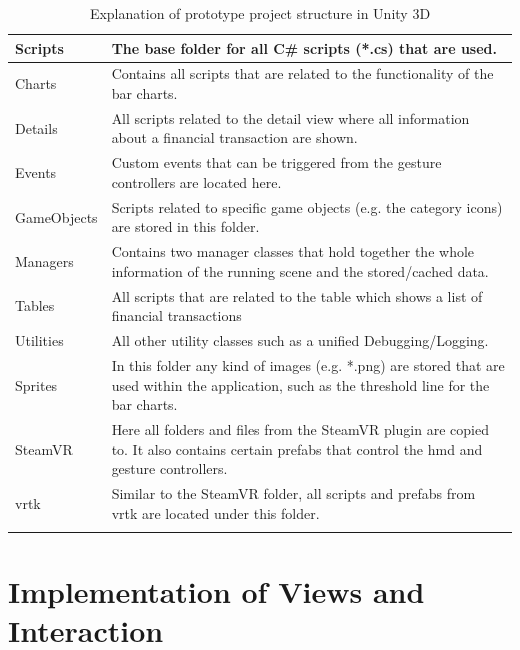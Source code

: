 \begin{longtable}{ | p{3cm} | p{11cm} |}
	\hline
		Scripts &
		The base folder for all C\# scripts (*.cs) that are used. \\
	\hline
		\textrightarrow{} Charts &
		Contains all scripts that are related to the functionality of the bar charts. \\
	\hline
		\textrightarrow{} Details &
		All scripts related to the detail view where all information about a financial transaction are shown. \\
	\hline
		\textrightarrow{} Events &
		Custom events that can be triggered from the gesture controllers are located here. \\
	\hline
		\textrightarrow{} GameObjects &
		Scripts related to specific game objects (e.g. the category icons) are stored in this folder. \\
	\hline
		\textrightarrow{} Managers &
		Contains two manager classes that hold together the whole information of the running scene and the stored/cached data. \\
	\hline
		\textrightarrow{} Tables &
		All scripts that are related to the table which shows a list of financial transactions \\
	\hline
		\textrightarrow{} Utilities &
		All other utility classes such as a unified Debugging/Logging. \\
	\hline
		Sprites &
		In this folder any kind of images (e.g. *.png) are stored that are used within the application, such as the threshold line for the bar charts. \\
	\hline
		SteamVR &
		Here all folders and files from the SteamVR plugin are copied to. It also contains certain prefabs that control the \gls{hmd} and gesture controllers. \\
	\hline
		\gls{vrtk} &
		Similar to the SteamVR folder, all scripts and prefabs from \gls{vrtk} are located under this folder. \\
	\hline
	\caption{Explanation of prototype project structure in Unity 3D}
	\label{tbl:codestructuredesc}
\end{longtable}



\section{Implementation of Views and Interaction}

